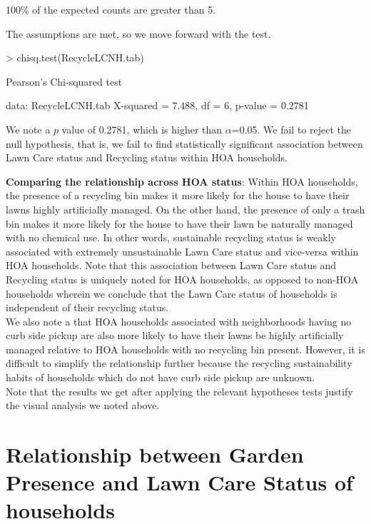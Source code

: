 \documentclass{article}
\begin{document}
100\% of the expected counts are greater than 5.

The assumptions are met, so we move forward with the test.

\begin{Schunk}
\begin{Sinput}
> chisq.test(RecycleLCNH.tab)
\end{Sinput}
\begin{Soutput}
	Pearson's Chi-squared test

data:  RecycleLCNH.tab
X-squared = 7.488, df = 6, p-value = 0.2781
\end{Soutput}
\end{Schunk}

We note a $p$ value of 0.2781, which is higher than $\alpha$=0.05. We fail to reject the null hypothesis, that is, we fail to find statistically significant association between Lawn Care status and Recycling status within HOA households.

\textbf{Comparing the relationship across HOA status}: Within HOA households, the presence of a recycling bin makes it more likely for the house to have their lawns highly artificially managed. On the other hand, the presence of only a trash bin makes it more likely for the house to have their lawn be naturally managed with no chemical use. In other words, sustainable recycling status is weakly associated with extremely unsustainable Lawn Care status and vice-versa within HOA households. Note that this association between Lawn Care status and Recycling status is uniquely noted for HOA households, as opposed to non-HOA households wherein we conclude that the Lawn Care status of households is independent of their recycling status.\\

We also note a that HOA households associated with neighborhoods having no curb side pickup are also more likely to have their lawns be highly artificially managed relative to HOA households with no recycling bin present. However, it is difficult to simplify the relationship further because the recycling sustainability habits of households which do not have curb side pickup are unknown.\\

Note that the results we get after applying the relevant hypotheses tests justify the visual analysis we noted above.\\

\section*{Relationship between Garden Presence and Lawn Care Status of households}
\end{document}

